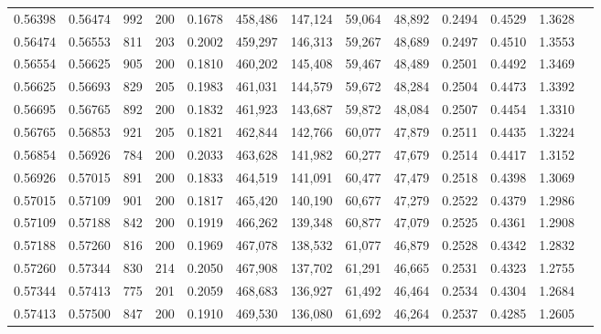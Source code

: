 \begin{tabular}{rrrrrrrrrrrrr}
0.56398 & 0.56474 &   992 & 200 &                                     0.1678 & 458,486 & 147,124 &  59,064 &  48,892 & 0.2494 & 0.4529 & 1.3628 \\
0.56474 & 0.56553 &   811 & 203 &                                     0.2002 & 459,297 & 146,313 &  59,267 &  48,689 & 0.2497 & 0.4510 & 1.3553 \\
0.56554 & 0.56625 &   905 & 200 &                                     0.1810 & 460,202 & 145,408 &  59,467 &  48,489 & 0.2501 & 0.4492 & 1.3469 \\
0.56625 & 0.56693 &   829 & 205 &                                     0.1983 & 461,031 & 144,579 &  59,672 &  48,284 & 0.2504 & 0.4473 & 1.3392 \\
0.56695 & 0.56765 &   892 & 200 &                                     0.1832 & 461,923 & 143,687 &  59,872 &  48,084 & 0.2507 & 0.4454 & 1.3310 \\
0.56765 & 0.56853 &   921 & 205 &                                     0.1821 & 462,844 & 142,766 &  60,077 &  47,879 & 0.2511 & 0.4435 & 1.3224 \\
0.56854 & 0.56926 &   784 & 200 &                                     0.2033 & 463,628 & 141,982 &  60,277 &  47,679 & 0.2514 & 0.4417 & 1.3152 \\
0.56926 & 0.57015 &   891 & 200 &                                     0.1833 & 464,519 & 141,091 &  60,477 &  47,479 & 0.2518 & 0.4398 & 1.3069 \\
0.57015 & 0.57109 &   901 & 200 &                                     0.1817 & 465,420 & 140,190 &  60,677 &  47,279 & 0.2522 & 0.4379 & 1.2986 \\
0.57109 & 0.57188 &   842 & 200 &                                     0.1919 & 466,262 & 139,348 &  60,877 &  47,079 & 0.2525 & 0.4361 & 1.2908 \\
0.57188 & 0.57260 &   816 & 200 &                                     0.1969 & 467,078 & 138,532 &  61,077 &  46,879 & 0.2528 & 0.4342 & 1.2832 \\
0.57260 & 0.57344 &   830 & 214 &                                     0.2050 & 467,908 & 137,702 &  61,291 &  46,665 & 0.2531 & 0.4323 & 1.2755 \\
0.57344 & 0.57413 &   775 & 201 &                                     0.2059 & 468,683 & 136,927 &  61,492 &  46,464 & 0.2534 & 0.4304 & 1.2684 \\
0.57413 & 0.57500 &   847 & 200 &                                     0.1910 & 469,530 & 136,080 &  61,692 &  46,264 & 0.2537 & 0.4285 & 1.2605 \\

\end{tabular}
